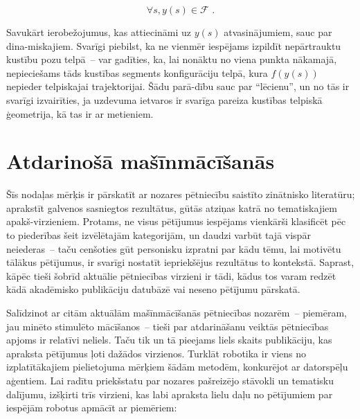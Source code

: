 \documentclass[12pt, a4paper]{article}
\numberwithin{equation}{section} %
\begin{document}
\begin{equation}
    \forall s,y(s) \in \mathcal{F}
\text{ .}
\end{equation}

Savukārt ierobežojumus, kas attiecināmi uz $y(s)$ atvasinājumiem, sauc par dina-miskajiem. Svarīgi piebilst, ka ne vienmēr iespējams izpildīt nepārtrauktu kustību pozu telpā~-- var gadīties, ka, lai nonāktu no viena punkta nākamajā, nepieciešams tāds kustības segments konfigurāciju telpā, kura $f(y(s))$ nepieder telpiskajai trajektorijai. Šādu parā-dību sauc par ``lēcienu'', un no tās ir svarīgi izvairīties, ja uzdevuma ietvaros ir svarīga pareiza kustības telpiskā ģeometrija, kā tas ir ar metieniem.


%
%
%
%
%
%
%
%
%
%
%
%
%
%
%
%
%
%
%

\newpage
\section{Atdarinošā mašīnmācīšanās}

Šīs nodaļas mērķis ir pārskatīt ar nozares pētniecību saistīto zinātnisko literatūru; aprakstīt galvenos sasniegtos rezultātus, gūtās atziņas katrā no tematiskajiem apakš-virzieniem. Protams, ne visus pētījumus iespējams vienkārši klasificēt pēc to piederības šeit izvēlētajām kategorijām, un daudzi varbūt tajā vispār neiederas~-- taču cenšoties gūt personisku izpratni par kādu tēmu, lai motivētu tālākus pētījumus, ir svarīgi nostatīt iepriekšējus rezultātus to kontekstā. Saprast, kāpēc tieši šobrīd aktuālie pētniecības virzieni ir tādi, kādus tos varam redzēt kādā akadēmisko publikāciju datubāzē vai neseno pētījumu pārskatā.

Salīdzinot ar citām aktuālām mašīnmācīšanās pētniecības nozarēm~-- piemēram, jau minēto stimulēto mācīšanos~-- tieši par atdarināšanu veiktās pētniecības apjoms ir relatīvi neliels. Taču tik un tā pieejams liels skaits publikāciju, kas apraksta pētījumus ļoti dažādos virzienos. Turklāt robotika ir viens no izplatītākajiem pielietojuma mērķiem šādām metodēm, konkurējot ar datorspēļu aģentiem. Lai radītu priekšstatu par nozares pašreizējo stāvokli un tematisku dalījumu, izšķirti trīs virzieni, kas labi apraksta lielu daļu no pētījumiem par iespējām robotus apmācīt ar piemēriem:
\end{document}

